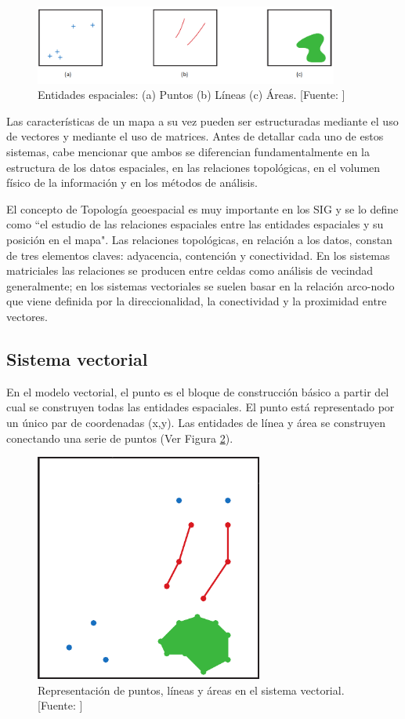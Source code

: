 \begin{figure}[H]
    \centering
    \includegraphics[width=10cm]{entidadesGeometricas.png}
    \caption{Entidades espaciales: (a) Puntos (b) Líneas (c) Áreas. [Fuente: \citet{Heywood2006AnSystems}]}
    \label{fig:entidadesPuntoLineaPoligono}
\end{figure}

Las características de un mapa a su vez pueden ser estructuradas mediante el uso de vectores y mediante el uso de matrices. Antes de detallar cada uno de estos sistemas, cabe mencionar que ambos se diferencian fundamentalmente en la estructura de los datos espaciales, en las relaciones topológicas, en el volumen físico de la información y en los métodos de análisis.

El concepto de Topología geoespacial es muy importante en los SIG y se lo define como ``el estudio de las relaciones espaciales entre las entidades espaciales y su posición en el mapa". Las relaciones topológicas, en relación a los datos, constan de tres elementos claves: adyacencia, contención y conectividad. En los sistemas matriciales las relaciones se producen entre celdas como análisis de vecindad generalmente; en los sistemas vectoriales se suelen basar en la relación arco-nodo que viene definida por la direccionalidad, la conectividad y la proximidad entre vectores.

\subsection{Sistema vectorial}

En el modelo vectorial, el punto es el bloque de construcción básico a partir del cual se construyen todas las entidades espaciales. El punto está representado por un único par de coordenadas (x,y). Las entidades de línea y área se construyen conectando una serie de puntos (Ver Figura \ref{fig:modeloVectorial}).

\begin{figure}[H]
    \centering
    \includegraphics[width=7.5cm]{modeloVectorial.png}
    \caption{Representación de puntos, líneas y áreas en el sistema vectorial. [Fuente: \citet{Heywood2006AnSystems}]}
    \label{fig:modeloVectorial}
\end{figure}

